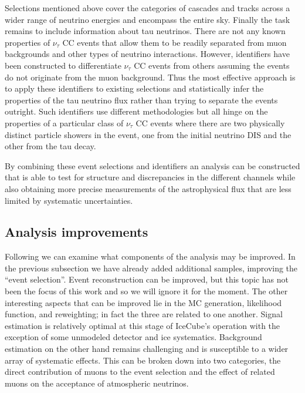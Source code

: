Selections mentioned above cover the categories of cascades and tracks across a wider range of neutrino energies and encompass the entire sky.
Finally the task remains to include information about tau neutrinos.
There are not any known properties of $\nu_\tau$ CC events that allow them to be readily separated from muon backgrounds and other types of neutrino interactions.
However, identifiers have been constructed to differentiate $\nu_\tau$ CC events from others assuming the events do not originate from the muon background.
Thus the most effective approach is to apply these identifiers to existing selections and statistically infer the properties of the tau neutrino flux rather than trying to separate the events outright.
Such identifiers use different methodologies but all hinge on the properties of a particular class of $\nu_\tau$ CC events where there are two physically distinct particle showers in the event, one from the initial neutrino DIS and the other from the tau decay.

By combining these event selections and identifiers an analysis can be constructed that is able to test for structure and discrepancies in the different channels while also obtaining more precise measurements of the astrophysical flux that are less limited by systematic uncertainties.

\subsection{Analysis improvements}
Following  we can examine what components of the analysis may be improved.
In the previous subsection we have already added additional samples, improving the ``event selection''.
Event reconstruction can be improved, but this topic has not been the focus of this work and so we will ignore it for the moment.
The other interesting aspects that can be improved lie in the MC generation, likelihood function, and reweighting; in fact the three are related to one another.
Signal estimation is relatively optimal at this stage of IceCube's operation with the exception of some unmodeled detector and ice systematics.
Background estimation on the other hand remains challenging and is susceptible to a wider array of systematic effects.
This can be broken down into two categories, the direct contribution of muons to the event selection and the effect of related muons on the acceptance of atmospheric neutrinos.

